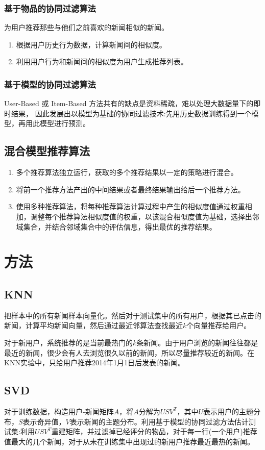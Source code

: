 \documentclass[UTF8]{article}
\begin{document}
\subsubsection{基于物品的协同过滤算法}
为用户推荐那些与他们之前喜欢的新闻相似的新闻。
	\begin{enumerate}
        \item 根据用户历史行为数据，计算新闻间的相似度。
        \item 利用用户行为和新闻间的相似度为用户生成推荐列表。
    \end{enumerate}
\subsubsection{基于模型的协同过滤算法}
User-Based 或 Item-Based 方法共有的缺点是资料稀疏，难以处理大数据量下的即时结果，
因此发展出以模型为基础的协同过滤技术:先用历史数据训练得到一个模型，再用此模型进行预测。
\subsection{混合模型推荐算法}
	\begin{enumerate}
        \item 多个推荐算法独立运行，获取的多个推荐结果以一定的策略进行混合。
        \item 将前一个推荐方法产出的中间结果或者最终结果输出给后一个推荐方法。
        \item 使用多种推荐算法，将每种推荐算法计算过程中产生的相似度值通过权重相加，调整每个推荐算法相似度值的权重，以该混合相似度值为基础，选择出邻域集合，并结合邻域集合中的评估信息，得出最优的推荐结果。
    \end{enumerate}

\section{方法}
\subsection{KNN}
把样本中的所有新闻样本向量化。然后对于测试集中的所有用户，根据其已点击的新闻，计算平均新闻向量，然后通过最近邻算法查找最近$k$个向量推荐给用户。

对于新用户，系统推荐的是当前最热门的$k$条新闻。由于用户浏览的新闻往往都是最近的新闻，很少会有人去浏览很久以前的新闻，所以尽量推荐较近的新闻。在KNN实验中，只给用户推荐2014年1月1日后发表的新闻。

\subsection{SVD}
对于训练数据，构造用户-新闻矩阵$A$，将$A$分解为$USV^{T}$，其中$U$表示用户的主题分布，$S$表示奇异值，$V$表示新闻的主题分布。利用基于模型的协同过滤方法估计测试集:利用$USV^{T}$重建矩阵，并过滤掉已经评分的物品，对于每一行(一个用户)推荐值最大的几个新闻，对于从未在训练集中出现过的新用户推荐最近最热的新闻。
\end{document}
